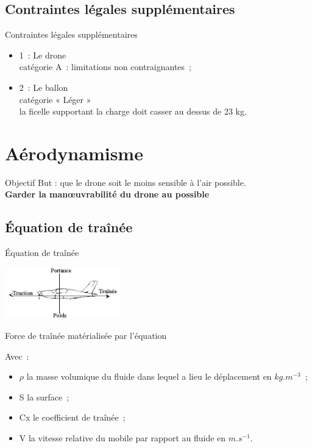 \documentclass{beamer}
\begin{document}
\subsection{Contraintes légales supplémentaires}
\begin{frame}{Contraintes légales supplémentaires}
  \begin{itemize}
    \item 1~: Le drone \\
	    catégorie A~: limitations non contraignantes~;
    \item 2~: Le ballon \\
	    catégorie « Léger » \\
	    la ficelle supportant la charge doit casser au dessus de 23 kg.
 \end{itemize}
\end{frame}

\section{Aérodynamisme}

\begin{frame}{Objectif}
 But : que le drone soit le moins sensible à l'air possible. \\
 \textbf{Garder la manœuvrabilité du drone au possible}
\end{frame}

\subsection{Équation de traînée}
\begin{frame}{Équation de traînée}
  \begin{center}
		\includegraphics[width=5cm]{../Images/portance.jpg}
	\end{center}
 Force de traînée matérialisée par l'équation \\
 \begin{center}
 \end{center}
 Avec~:
 \begin{itemize}
  \item $\rho$ la masse volumique du fluide dans lequel a lieu le déplacement en $kg.m^{-3}$~;
  \item S la surface~;
  \item Cx le coefficient de traînée~;
  \item V la vitesse relative du mobile par rapport au fluide en $m.s^{-1}$.
 \end{itemize}
\end{frame}
\end{document}
